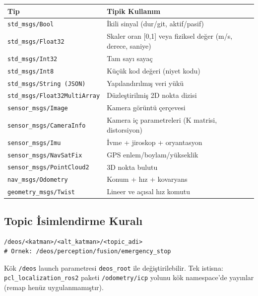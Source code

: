 \documentclass[11pt,a4paper]{article}
\begin{document}
\begin{center}
\begin{tabular}{@{}ll@{}}
\toprule
\textbf{Tip} & \textbf{Tipik Kullanım} \\
\midrule
\texttt{std\_msgs/Bool}              & İkili sinyal (dur/git, aktif/pasif) \\
\texttt{std\_msgs/Float32}           & Skaler oran [0,1] veya fiziksel değer (m/s, derece, saniye) \\
\texttt{std\_msgs/Int32}             & Tam sayı sayaç \\
\texttt{std\_msgs/Int8}              & Küçük kod değeri (niyet kodu) \\
\texttt{std\_msgs/String (JSON)}     & Yapılandırılmış veri yükü \\
\texttt{std\_msgs/Float32MultiArray} & Düzleştirilmiş 2D nokta dizisi \\
\texttt{sensor\_msgs/Image}          & Kamera görüntü çerçevesi \\
\texttt{sensor\_msgs/CameraInfo}     & Kamera iç parametreleri (K matrisi, distorsiyon) \\
\texttt{sensor\_msgs/Imu}            & İvme + jiroskop + oryantasyon \\
\texttt{sensor\_msgs/NavSatFix}      & GPS enlem/boylam/yükseklik \\
\texttt{sensor\_msgs/PointCloud2}    & 3D nokta bulutu \\
\texttt{nav\_msgs/Odometry}          & Konum + hız + kovaryans \\
\texttt{geometry\_msgs/Twist}        & Lineer ve açısal hız komutu \\
\bottomrule
\end{tabular}
\end{center}

\subsection{Topic İsimlendirme Kuralı}

\begin{lstlisting}
/deos/<katman>/<alt_katman>/<topic_adi>
# Ornek: /deos/perception/fusion/emergency_stop
\end{lstlisting}

Kök \texttt{/deos} launch parametresi \texttt{deos\_root} ile değiştirilebilir.
Tek istisna: \texttt{pcl\_localization\_ros2} paketi \texttt{/odometry/icp} yolunu
kök namespace'de yayınlar (remap henüz uygulanmamıştır).

\newpage
\end{document}
